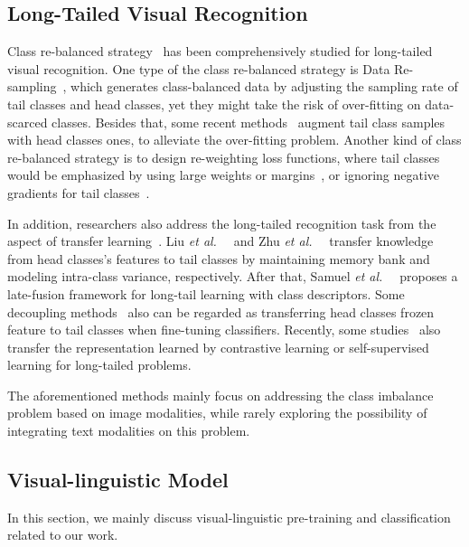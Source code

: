 \documentclass[runningheads]{llncs}
\def\etal{{\em et al.~}}
\begin{document}
\subsection{Long-Tailed Visual Recognition}
Class re-balanced strategy~\cite{han2005borderline,khan2017cost,cao2019learning,drummond2003c4,wang2017learning,jamal2020rethinking}
has been comprehensively studied for long-tailed visual recognition.
One type of the class re-balanced strategy is Data Re-sampling~\cite{drummond2003c4,buda2018systematic,chawla2002smote,han2005borderline,chu2020feature,shen2016relay}, which generates class-balanced data by adjusting the sampling rate of tail classes and head classes, yet they might take the risk of over-fitting on data-scarced classes.
Besides that, some recent methods~\cite{chu2020feature,kim2020m2m} augment tail class samples with head classes ones, to alleviate the over-fitting problem. 
Another kind of class re-balanced strategy is to design re-weighting loss functions, where tail classes would be emphasized by using large weights or margins~\cite{cui2019class,khan2017cost,huang2016learning,wang2017learning,cao2019learning}, or ignoring negative gradients for tail classes~\cite{tan2020equalization}.


In addition, researchers also address the long-tailed recognition task from the aspect of transfer learning~\cite{liu2019large,zhu2020inflated,yin2019feature,kang2019decoupling,zhou2020bbn}.
Liu \etal~\cite{liu2019large} and Zhu \etal~\cite{zhu2020inflated} transfer knowledge from head classes's features to
tail classes by maintaining memory bank and modeling intra-class variance, respectively.
After that, Samuel \etal~\cite{samuel2021generalized} proposes a late-fusion framework for long-tail learning with class descriptors.
Some decoupling methods~\cite{zhou2020bbn,kang2019decoupling} also can be regarded as transferring head classes frozen feature to tail classes when fine-tuning classifiers. 
Recently, some studies~\cite{kang2020exploring,wang2021contrastive,cui2021parametric,samuel2021distributional,zhang2021test} also transfer the representation learned by contrastive learning or self-supervised learning for long-tailed problems.

The aforementioned methods mainly focus on addressing the class imbalance problem based on image modalities, while rarely exploring the possibility of integrating text modalities on this problem.

\subsection{Visual-linguistic Model}
In this section, we mainly discuss visual-linguistic pre-training and classification related to our work.
\end{document}
